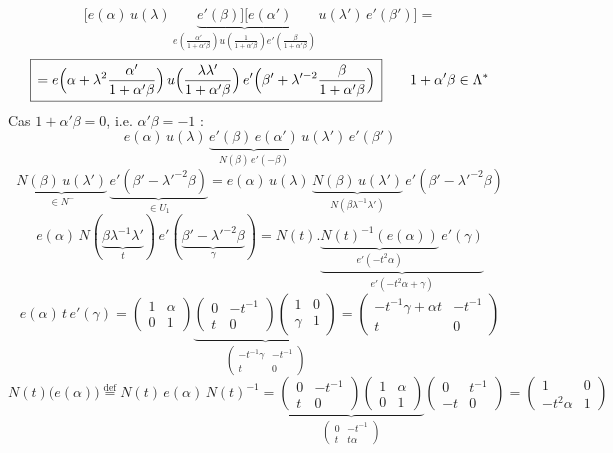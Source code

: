 \documentclass[11pt,a4paper]{article}
\begin{document}
\[
\bigl[e(\alpha)\, u(\lambda)\, \underbrace{e'(\beta)\bigr]\bigl[e(\alpha')}_{e\left(\frac{\alpha'}{1 + \alpha'\beta}\right) u\left(\frac{1}{1 + \alpha'\beta}\right) e'\left(\frac{\beta}{1 + \alpha'\beta}\right)}\, u(\lambda')\, e'(\beta')\bigr] =
\]
\[
\boxed{\, = e\Bigl(\alpha + \lambda^2 \frac{\alpha'}{1 + \alpha'\beta}\Bigr)\, u\Bigl(\frac{\lambda\lambda'}{1 + \alpha'\beta}\Bigr)\, e'\Bigl(\beta' + \lambda'^{-2} \frac{\beta}{1 + \alpha'\beta}\Bigr) \,}
\qquad 1 + \alpha'\beta \in \Lambda^*
\]
Cas $1 + \alpha'\beta = 0$, i.e. $\alpha'\beta = -1$ :
\[
e(\alpha)\, u(\lambda)\, \underbrace{e'(\beta)\, e(\alpha')}_{N(\beta)\, e'(-\beta)}\, u(\lambda')\, e'(\beta')
\]
\struck{\ill{}}
\[
\underbrace{N(\beta)\, u(\lambda')}_{\in N^-}\, \underbrace{e'(\beta' - \lambda'^{-2}\beta)}_{\in U_1}
= e(\alpha)\, u(\lambda)\, \underbrace{N(\beta)\, u(\lambda')}_{N(\beta\lambda^{-1}\lambda')}\, e'(\beta' - \lambda'^{-2}\beta)
\]
\[
e(\alpha)\, N(\underbrace{\beta\lambda^{-1}\lambda'}_{t})\, e'(\underbrace{\beta' - \lambda'^{-2}\beta}_{\gamma})
= N(t) . \underbrace{\underbrace{N(t)^{-1}(e(\alpha))}_{e'(-t^2\alpha)}\, e'(\gamma)}_{e'(-t^2\alpha + \gamma)}
\]
\[
e(\alpha)\, t\, e'(\gamma) = \begin{pmatrix} 1 & \alpha \\ 0 & 1 \end{pmatrix}
\underbrace{\begin{pmatrix} 0 & -t^{-1} \\ t & 0 \end{pmatrix} \begin{pmatrix} 1 & 0 \\ \gamma & 1 \end{pmatrix}}_{\begin{pmatrix} -t^{-1}\gamma & -t^{-1} \\ t & 0 \end{pmatrix}}
= \begin{pmatrix} -t^{-1}\gamma + \alpha t & -t^{-1} \\ t & 0 \end{pmatrix}
\]
\[
N(t)\bigl(e(\alpha)\bigr) \overset{\mathrm{def}}{=} N(t)\, e(\alpha)\, N(t)^{-1}
= \underbrace{\begin{pmatrix} 0 & -t^{-1} \\ t & 0 \end{pmatrix} \begin{pmatrix} 1 & \alpha \\ 0 & 1 \end{pmatrix}}_{\begin{pmatrix} 0 & -t^{-1} \\ t & t\alpha \end{pmatrix}}
\begin{pmatrix} 0 & t^{-1} \\ -t & 0 \end{pmatrix}
= \begin{pmatrix} 1 & 0 \\ -t^2\alpha & 1 \end{pmatrix}
\]
\end{document}

